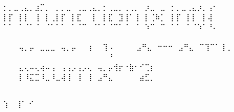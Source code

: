 \documentclass{article}
\begin{document}
{\obeylines\braille
⡂⡀⣀⢀⣄⡀⣰⡉⡀⠀⡀⡀⣀⠀⢀⣀⢀⣄⡀⡂⢀⣀⡀⢀⢀⡀⠀⡰⣀⠀⣀⠀⡂⡀⣀⢀⣄⡰⡀⢠⠂
⡇⡏⠀⡇⡇⠀⢸⠀⡇⢀⡇⡏⠀⡇⣏⠀⠀⡇⠀⡇⣏⠀⣹⢸⠁⢸⠀⡇⢈⠷⡁⠀⡇⡏⠀⡇⡇⠀⡇⢼⠀
⠁⠁⠀⠁⠈⠁⠈⠀⠈⠁⠁⠁⠀⠁⠈⠉⠀⠈⠁⠁⠈⠉⠁⠈⠀⠈⠀⠱⠉⠀⠉⠀⠁⠁⠀⠁⠈⠱⠁⠘⠄
⠀⠀⠀⠀⠀⠀⠀⠀⠀⠀⠀⠀⠀⠀⠀⠀⠀⠀⠀⠀⠀⠀⠀⠀⠀⠀⠀⠀⠀⠀⠀⠀⠀⠀⠀⠀⠀⠀⠀⠀⠀
⠀⠀⠀⢤⡀⡤⠀⣀⣀⣀⠀⢤⡀⡤⠀⠀⢰⠀⠀⢹⠠⠀
⠀⠀⠀⣠⠛⣄⠀⠒⠒⠒⠀⣠⠛⣄⠀⠉⢹⠉⠁⢸⢀⠀
⠀⠀⠀⠀⠀⠀⠀⠀⠀⠀⠀⠀⠀⠀⠀⠀⠀⠀⠀⠀⠘⠀
⠀⠀⠀⣄⢄⠤⢄⢴⠤⢠⠀⢠⢠⡠⢠⡠⢄⠀⢤⡀⡤⢺⡖⠐⣷⠂⠊⢉⡆
⠀⠀⠀⡇⠸⣍⣉⠸⣀⠸⣀⢼⢸⠀⢸⠀⢸⠀⣠⠛⣄⠀⠀⠀⠀⠀⣴⣋⡀
⠀⠀⠀⠀⠀⠀⠀⠀⠀⠀⠀⠀⠀⠀⠀⠀⠀⠀⠀⠀⠀⠀⠀⠀⠀⠀⠀⠀⠀

⢱⠀
⢸⠁
⠊
} 
\end{document}
